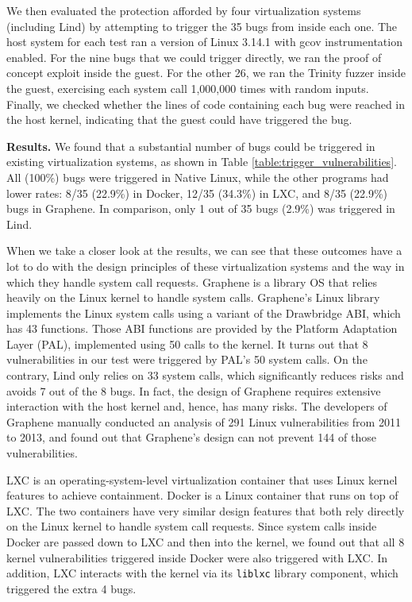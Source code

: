 {{{We then evaluated the protection afforded by four virtualization systems (including Lind) by attempting to trigger the 35 bugs from inside each one.
The host system for each test ran a version of Linux 3.14.1 with gcov instrumentation enabled.
For the nine bugs that we could trigger directly, we ran the proof of concept exploit inside the guest.
For the other 26, we ran the Trinity fuzzer inside the guest, exercising each system call 1,000,000 times with random inputs.
Finally, we checked whether the lines of code containing each bug were reached in the host kernel,
indicating that the guest could have triggered the bug.

\noindent
\textbf{Results.}
We found that a substantial number of bugs could be triggered in existing
virtualization systems, as shown in Table \ref{table:trigger_vulnerabilities}.
All (100\%) bugs were triggered in Native Linux,
while the other programs had lower rates: 8/35 (22.9\%)  in Docker,
12/35 (34.3\%)  in LXC, and 8/35 (22.9\%) bugs in Graphene.
In comparison, only 1 out of 35 bugs  (2.9\%) was triggered in Lind.


When we take a closer look at the results, we can see that these outcomes
have a lot to do with the design principles of these virtualization systems and
the way in which they handle system call requests.
Graphene \cite{Graphene-14} is a library OS that relies heavily on the Linux kernel to handle system calls.
Graphene's Linux library implements the Linux system calls using a variant of the
Drawbridge \cite{Drawbridge-11} ABI, which has 43 functions. Those ABI functions
are provided by the Platform Adaptation Layer (PAL), implemented using 50 calls
to the kernel. It turns out that 8 vulnerabilities in our test were triggered by PAL's
50 system calls. On the contrary, Lind only relies on 33 system calls, which significantly reduces
risks and avoids 7 out of the 8 bugs. In fact, the design of Graphene requires extensive interaction
with the host kernel and, hence, has many risks. The developers of Graphene manually conducted
an analysis of 291 Linux vulnerabilities from 2011 to 2013, and found out that Graphene's design can not prevent 144 of those vulnerabilities.

LXC \cite{LXC} is an operating-system-level virtualization container that uses Linux kernel features to achieve containment.
Docker \cite{Docker} is a Linux container that runs on top of LXC. The two containers have very similar design features
that both rely directly on the Linux kernel to handle system call requests. Since system calls inside Docker are passed down
to LXC and then into the kernel, we found out that all 8 kernel vulnerabilities triggered inside Docker were also triggered
with LXC. In addition, LXC interacts with the kernel via its \texttt{liblxc} library component, which triggered the extra 4 bugs.

}}}
